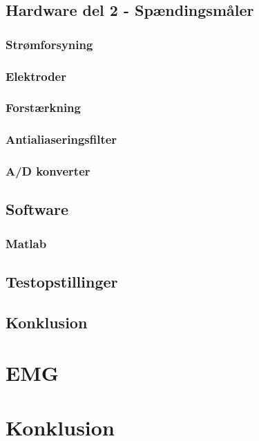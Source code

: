 \section{Hardware del 2 - Spændingsmåler}
\subsection{Strømforsyning}
\subsection{Elektroder}
\subsection{Forstærkning}
\subsection{Antialiaseringsfilter}
\subsection{A/D konverter}
\citep{Aroom2009}

\section{Software}
\subsection{Matlab}

\section{Testopstillinger}
\section{Konklusion}

\chapter{EMG}

\chapter{Konklusion}






